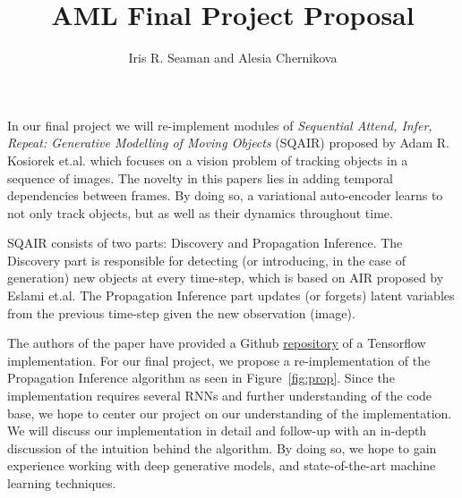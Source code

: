 \documentclass{article}
\title{AML Final Project Proposal}
\author{Iris R. Seaman and Alesia Chernikova }
\date{}
\begin{document}
\maketitle


In our final project we will re-implement modules of \textit{Sequential Attend, Infer, Repeat: Generative Modelling of Moving Objects} (SQAIR) proposed by Adam R. Kosiorek et.al. which focuses on a vision problem of tracking objects in a sequence of images. The novelty in this papers lies in adding temporal dependencies between frames. By doing so, a variational auto-encoder learns to not only track objects, but as well as their dynamics throughout time. %

SQAIR consists of two parts: Discovery and Propagation Inference. The Discovery part is responsible for detecting (or introducing, in the case of generation) new objects at every time-step, which is based on  AIR proposed by Eslami et.al. The Propagation Inference part updates (or forgets) latent variables from the previous time-step given the new observation (image).

The authors of the paper have provided a Github \href{https://github.com/akosiorek/sqair/blob/master/sqair/sqair_modules.py}{repository} of a Tensorflow implementation. For our final project, we propose a re-implementation of the Propagation Inference algorithm as seen in Figure~\ref{fig:prop}. Since the implementation requires several RNNs and further understanding of the code base, we hope to center our project on our understanding of the implementation. We will discuss our implementation in detail and follow-up with an in-depth discussion of the intuition behind the algorithm. By doing so, we hope to gain experience working with deep generative models, and state-of-the-art machine learning techniques. 

\end{document}
